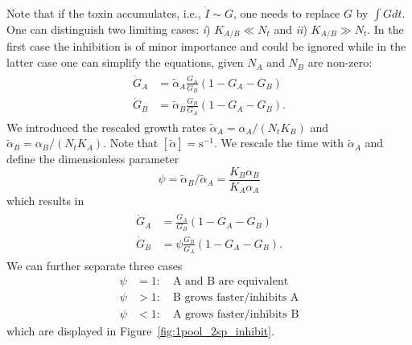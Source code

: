 \documentclass[10pt,twocolumn,5p]{elsarticle}
\numberwithin{equation}{section}
\begin{document}
Note that if the toxin accumulates, i.e., $\dot I \sim G$,  one needs to replace $G$ by $\int G dt$.
One can distinguish two limiting cases: {\it i}) $K_{A/B}\ll N_t$ and {\it ii}) $K_{A/B}\gg N_t$.
In the first case the inhibition is of minor importance and could be ignored while in the latter case one can simplify the equations, given $N_A$ and $N_B$ are non-zero:
\begin{align}\begin{split}
    \dot{G}_A &=\tilde{\alpha}_A\frac{G_A}{G_B}\left(1 - G_A-G_B\right)\\
    \dot{G}_B &= \tilde{\alpha}_B\frac{G_B}{G_A}\left(1 - G_A-G_B\right).
\end{split}\end{align}
We introduced the rescaled growth rates $\tilde{\alpha}_A=\alpha_A/(N_tK_B)$ and $\tilde{\alpha}_B=\alpha_B/(N_tK_A)$.
Note that $[\tilde{\alpha}]=\mathrm{s}^{-1}$.
We rescale the time with $\tilde{\alpha}_A$ and define the dimensionless parameter
\begin{equation}
    \psi = \tilde{\alpha}_B/\tilde{\alpha}_A = \frac{K_B\alpha_B}{K_A\alpha_A}
\end{equation}
which results in
\begin{align}
    \begin{split}
        \dot{G}_A &=\frac{G_A}{G_B}\left(1 - G_A-G_B\right)\\
        \dot{G}_B &=\psi\frac{G_B}{G_A}\left(1-G_A-G_B\right). 
    \end{split}
\label{eq:2sp_1pool_inhibit_unitless}
\end{align}
We can further separate three cases
\begin{align}
    \psi&=1:\quad\text{A and B are equivalent}\\
    \psi&>1:\quad\text{B grows faster/inhibits A}\\
    \psi&<1:\quad\text{A grows faster/inhibits B}
\end{align}
which are displayed in Figure~\ref{fig:1pool_2sp_inhibit}.
%
\end{document}
